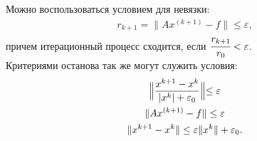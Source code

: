 \documentclass[12pt,a4paper]{article}
\begin{document}
\begin{enumerate}
Можно воспользоваться условием для невязки:
\begin{gather*}
r_{k+1}=\|A x^{(k+1)}-f\| \le \varepsilon,
\end{gather*}
причем итерационный процесс сходится, если $\cfrac{r_{k+1}}{r_0}<\varepsilon$.\\
Критериями останова так же могут служить условия:\\
\begin{gather*}
\Bigr\|\frac{x^{k+1}-x^k}{|x^k|+\varepsilon_0}\Bigl\| \le \varepsilon\\
\|A x^{(k+1)}-f\|\le \varepsilon\\
\|x^{k+1}-x^k\|\le \varepsilon \|x^k\|+\varepsilon_0.
\end{gather*}
\end{enumerate}
\end{document}
